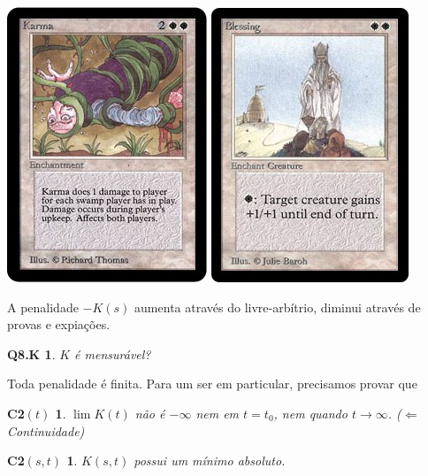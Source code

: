 \documentclass[12pt,a4paper]{article}
\begin{document}
			\begin{center}
			\includegraphics{carma} \includegraphics{blessing}
			\end{center}

			A penalidade $ - K(s) $ aumenta atrav\'es do livre-arb\'itrio, diminui atrav\'es de provas e expia\c{c}\~oes.

			\newtheorem{Q8.K}{Q8.K}
			\begin{Q8.K} $K$ \'e mensur\'avel?
			\end{Q8.K}

			Toda penalidade \'e finita. Para um ser em particular, precisamos provar que

			\newtheorem{C2t}{C2$(t)$}
			\begin{C2t} $ \lim K(t) $ n\~ao \'e $ - \infty $ nem em $ t = t_0 $, nem quando $ t \rightarrow \infty $. ($\Leftarrow$ Continuidade)
			\end{C2t}

			\newtheorem{C2st}{C2$(s,t)$}
			\begin{C2st} $K(s,t)$ possui um m\'inimo absoluto.
			\end{C2st}
\end{document}
